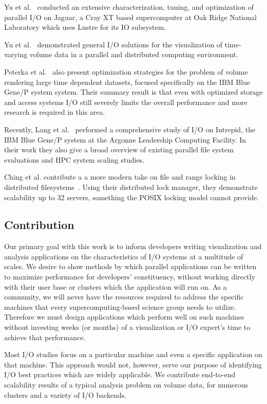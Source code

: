 Yu et al.~\cite{Yu:2008:PADP} conducted an extensive characterization,
tuning, and optimization of parallel I/O on Jaguar, a Cray XT based
supercomputer at Oak Ridge National Laboratory which uses Lustre
\cite{Sun:2008:PSIW} for its IO subsystem.

Yu et al.~\cite{Yu:2004:ISFP} demonstrated general I/O solutions
for the visualization of time-varying volume data in a parallel and
distributed computing environment.

Peterka et al.~\cite{Peterka:2009:ETES} also present optimization
strategies for the problem of volume rendering large time dependent
datasets, focused specifically on the IBM Blue Gene/P system
system. Their summary result is that even with optimized storage and
access systems I/O still severely limits the overall performance and
more research is required in this area.

Recently, Lang et al.~\cite{Lang:2009:IPCA} performed a comprehensive
study of I/O on Intrepid, the IBM Blue Gene/P system at the Argonne
Leadership Computing Facility. In their work they also give a broad
overview of existing parallel file system evaluations and HPC system
scaling studies.

Ching et al. contribute a a more modern take on file and range locking
in distributed filesystems~\cite{Ching:2007:Locking}.  Using their
distributed lock manager, they demonstrate scalability up to 32
servers, something the POSIX locking model cannot provide.

\subsection{Contribution}\label{sec:contribution}

Our primary goal with this work is to inform developers writing
visualization and analysis applications on the characteristics of
I/O systems at a multitude of scales.  We desire to show methods by
which parallel applications can be written to maximize performance for
developers' constituency, without working directly with their user base
or clusters which the application will run on.  As a community, we will
never have the resources required to address the specific machines that
every supercomputing-based science group needs to utilize.  Therefore
we must design applications which perform well on such machines without
investing weeks (or months) of a visualization or I/O expert's time to
achieve that performance.

Most I/O studies focus on a particular machine and even a specific
application on that machine.  This approach would not, however,
serve our purpose of identifying I/O best practices which are widely
applicable.  We contribute end-to-end scalability results of a typical
analysis problem on volume data, for numerous clusters and a variety of
I/O backends.


